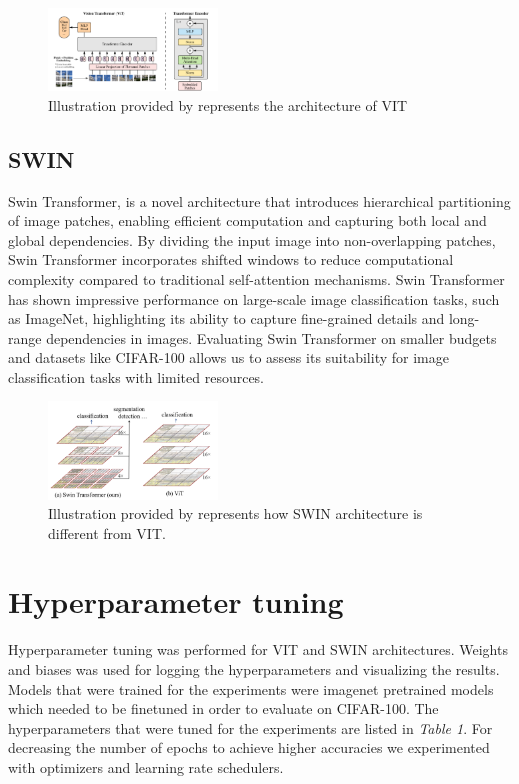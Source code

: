 \documentclass{article}
\begin{document}
\begin{figure}[ht]
    \vskip 0.2in
    \centering
    \includegraphics[width=0.4\textwidth]{vit.png}
    \caption{Illustration provided by \cite{DBLP:journals/corr/abs-2010-11929} represents the architecture of VIT}
    \label{fig:foobar}
    \vskip -0.2in
\end{figure}

\subsection{SWIN}
Swin Transformer, is a novel architecture that introduces hierarchical partitioning of image patches, enabling efficient computation and capturing both local and global dependencies. By dividing the input image into non-overlapping patches, Swin Transformer incorporates shifted windows to reduce computational complexity compared to traditional self-attention mechanisms. Swin Transformer has shown impressive performance on large-scale image classification tasks, such as ImageNet, highlighting its ability to capture fine-grained details and long-range dependencies in images. Evaluating Swin Transformer on smaller budgets and datasets like CIFAR-100 allows us to assess its suitability for image classification tasks with limited resources.

\begin{figure}[ht]
    \vskip 0.2in
    \centering
    \includegraphics[width=0.4\textwidth]{swin.png}
    \caption{Illustration provided by \cite{DBLP:journals/corr/abs-2103-14030} represents how SWIN architecture is different from VIT.}
    \label{fig:foobar}
    \vskip -0.2in
\end{figure}

\section{Hyperparameter tuning}
Hyperparameter tuning was performed for VIT and SWIN architectures.
Weights and biases \cite{wandb} was used for logging the hyperparameters and visualizing the results.
Models that were trained for the experiments were imagenet pretrained models which needed to be finetuned in order to evaluate on CIFAR-100. 
The hyperparameters that were tuned for the experiments are listed in \textit{Table 1}.
For decreasing the number of epochs to achieve higher accuracies we experimented with optimizers and learning rate schedulers.
\end{document}
